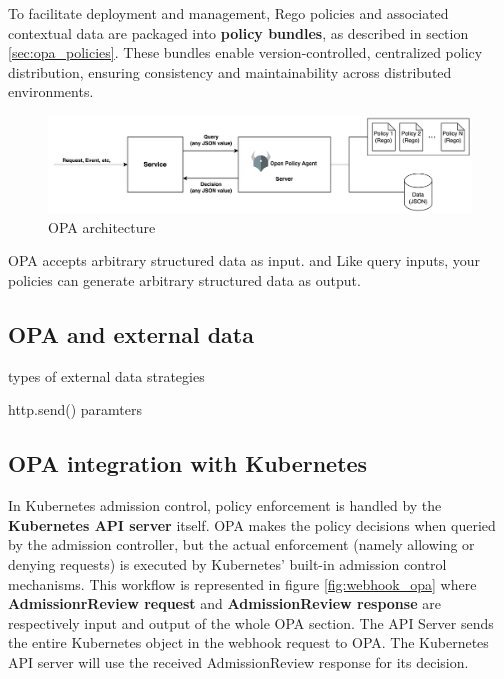 To facilitate deployment and management, Rego policies and associated contextual data are packaged into \textbf{policy bundles}, as described in section \ref{sec:opa_policies}. These bundles enable version-controlled, centralized policy distribution, ensuring consistency and maintainability across distributed environments. \newline


\begin{figure}[htb]
\centering
\includegraphics[width=1\linewidth]{images/OPA.png}
\caption{OPA architecture}
\label{fig:opa_architecture}
\end{figure}


OPA accepts arbitrary structured data as input.
and  Like query inputs, your policies can generate arbitrary structured data as output.

\subsection{OPA and external data}

types of external data strategies

http.send()
paramters 



\subsection{OPA integration with Kubernetes}

In Kubernetes admission control, policy enforcement is handled by the \textbf{Kubernetes API server} itself. OPA makes the policy decisions when queried by the admission controller, but the actual enforcement (namely allowing or denying requests) is executed by Kubernetes' built-in admission control mechanisms. This workflow is represented in figure \ref{fig:webhook_opa} where \textbf{AdmissionrReview request} and \textbf{AdmissionReview response} are respectively input and output of the whole OPA section. The API Server sends the entire Kubernetes object in the webhook request to OPA. %
The Kubernetes API server will use the received AdmissionReview response for its decision. \\


